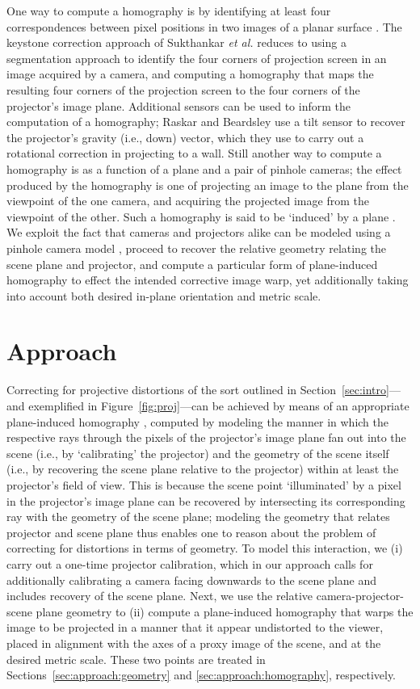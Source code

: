 \documentclass[review]{elsarticle}
\begin{document}
One way to compute a homography is by identifying at least four correspondences between pixel positions in two images of a planar surface \cite{Hartley2004}. The keystone correction approach of Sukthankar \textit{et al.} \cite{sukthankar2001smarter} reduces to using a segmentation approach to identify the four corners of projection screen in an image acquired by a camera, and computing a homography that maps the resulting four corners of the projection screen to the four corners of the projector's image plane. Additional sensors can be used to inform the computation of a homography; Raskar and Beardsley \cite{raskar2001self} use a tilt sensor to recover the projector's gravity (i.e., down) vector, which they use to carry out a rotational correction in projecting to a wall. Still another way to compute a homography is as a function of a plane and a pair of pinhole cameras; the effect produced by the homography is one of projecting an image to the plane from the viewpoint of the one camera, and acquiring the projected image from the viewpoint of the other. Such a homography is said to be `induced' by a plane \cite{Hartley2004}. We exploit the fact that cameras and projectors alike can be modeled using a pinhole camera model \cite{bimber2019spatial}, proceed to recover the relative geometry relating the scene plane and projector, and compute a particular form of plane-induced homography to effect the intended corrective image warp, yet additionally taking into account both desired in-plane orientation and metric scale.

\section{Approach}

Correcting for projective distortions of the sort outlined in Section~\ref{sec:intro}---and exemplified in Figure~\ref{fig:proj}---can be achieved by means of an appropriate plane-induced homography \cite{Hartley2004}, computed by modeling the manner in which the respective rays through the pixels of the projector's image plane fan out into the scene (i.e., by `calibrating' the projector) and the geometry of the scene itself (i.e., by recovering the scene plane relative to the projector) within at least the projector's field of view. This is because the scene point `illuminated' by a pixel in the projector's image plane can be recovered by intersecting its corresponding ray with the geometry of the scene plane; modeling the geometry that relates projector and scene plane thus enables one to reason about the problem of correcting for distortions in terms of geometry. To model this interaction, we (i) carry out a one-time projector calibration, which in our approach calls for additionally calibrating a camera facing downwards to the scene plane and includes recovery of the scene plane. Next, we use the relative camera-projector-scene plane geometry to (ii) compute a plane-induced homography that warps the image to be projected in a manner that it appear undistorted to the viewer, placed in alignment with the axes of a proxy image of the scene, and at the desired metric scale. These two points are treated in Sections~\ref{sec:approach:geometry} and \ref{sec:approach:homography}, respectively.
\end{document}

